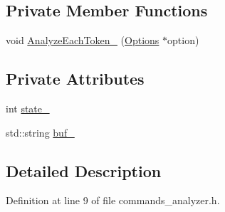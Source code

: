 \subsection*{Private Member Functions}
\begin{DoxyCompactItemize}
\item 
void \hyperlink{classmocha_1_1_commands_analyzer_ab16d0d0f90dd44d97ad4ba34cfd0a25e}{AnalyzeEachToken\_\-} (\hyperlink{classmocha_1_1_options}{Options} $\ast$option)
\end{DoxyCompactItemize}
\subsection*{Private Attributes}
\begin{DoxyCompactItemize}
\item 
int \hyperlink{classmocha_1_1_commands_analyzer_acebf245eb9e6e813c4e29c3b486bd654}{state\_\-}
\item 
std::string \hyperlink{classmocha_1_1_commands_analyzer_afcbd08ec81044c6269b8c360e71c744e}{buf\_\-}
\end{DoxyCompactItemize}


\subsection{Detailed Description}


Definition at line 9 of file commands\_\-analyzer.h.




